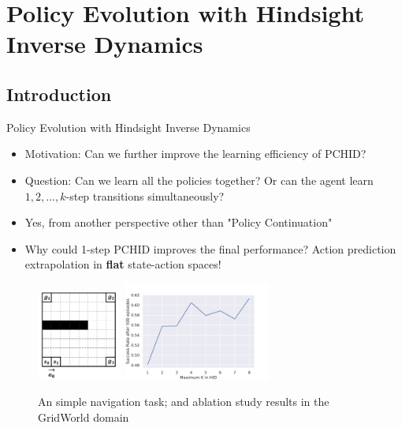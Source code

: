 \documentclass[10pt,hyperref={CJKbookmarks=true},envcountsect,mathserif]{beamer}
\begin{document}
\section{Policy Evolution with Hindsight Inverse Dynamics}
\subsection{Introduction}

\begin{frame}{Policy Evolution with Hindsight Inverse Dynamics}

\begin{itemize}
\item Motivation: Can we further improve the learning efficiency of PCHID?
\item Question: Can we learn all the policies together? Or can the agent learn $1,2,...,k$-step transitions simultaneously?
\item Yes, from another perspective other than "Policy Continuation"
\item Why could 1-step PCHID improves the final performance? Action prediction extrapolation in \textbf{flat} state-action spaces!
\end{itemize}

\begin{figure}
\centering
\includegraphics[width=1.1in]{figures/gridmap.pdf}
\includegraphics[width=1.9in]{figures/Max_K.pdf}
\caption{An simple navigation task; and ablation study results in the GridWorld domain}
\end{figure}
\end{frame}
\end{document}
